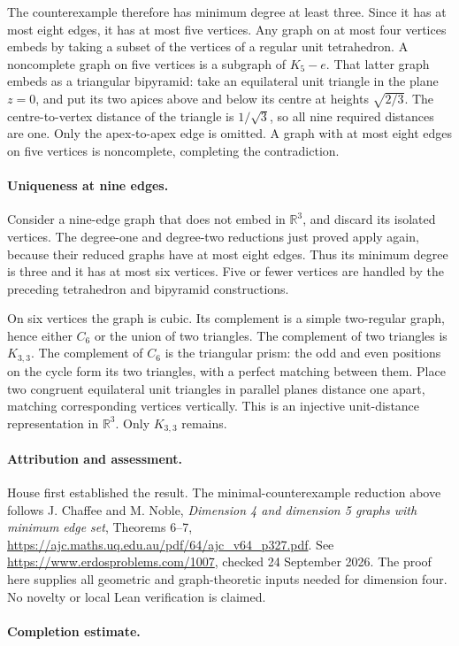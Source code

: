 The counterexample therefore has minimum degree at least three. Since it has at most eight edges, it has at most five vertices. Any graph on at most four vertices embeds by taking a subset of the vertices of a regular unit tetrahedron. A noncomplete graph on five vertices is a subgraph of \(K_5-e\). That latter graph embeds as a triangular bipyramid: take an equilateral unit triangle in the plane \(z=0\), and put its two apices above and below its centre at heights \(\sqrt{2/3}\). The centre-to-vertex distance of the triangle is \(1/\sqrt3\), so all nine required distances are one. Only the apex-to-apex edge is omitted. A graph with at most eight edges on five vertices is noncomplete, completing the contradiction.

\paragraph{Uniqueness at nine edges.}
Consider a nine-edge graph that does not embed in \(\mathbb R^3\), and discard its isolated vertices. The degree-one and degree-two reductions just proved apply again, because their reduced graphs have at most eight edges. Thus its minimum degree is three and it has at most six vertices. Five or fewer vertices are handled by the preceding tetrahedron and bipyramid constructions.

On six vertices the graph is cubic. Its complement is a simple two-regular graph, hence either \(C_6\) or the union of two triangles. The complement of two triangles is \(K_{3,3}\). The complement of \(C_6\) is the triangular prism: the odd and even positions on the cycle form its two triangles, with a perfect matching between them. Place two congruent equilateral unit triangles in parallel planes distance one apart, matching corresponding vertices vertically. This is an injective unit-distance representation in \(\mathbb R^3\). Only \(K_{3,3}\) remains.

\paragraph{Attribution and assessment.}
House first established the result. The minimal-counterexample reduction above follows J. Chaffee and M. Noble, \emph{Dimension 4 and dimension 5 graphs with minimum edge set}, Theorems 6--7, \url{https://ajc.maths.uq.edu.au/pdf/64/ajc_v64_p327.pdf}. See \url{https://www.erdosproblems.com/1007}, checked 24 September 2026. The proof here supplies all geometric and graph-theoretic inputs needed for dimension four. No novelty or local Lean verification is claimed.

\paragraph{Completion estimate.}
